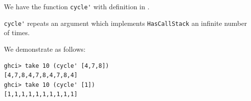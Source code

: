 We have the function \verb|cycle'| with definition in .

\verb|cycle'| repeats an argument which implements \verb|HasCallStack| an
infinite number of times.\par
\qquad We demonstrate as follows:
\begin{lstlisting}
ghci> take 10 (cycle' [4,7,8])
[4,7,8,4,7,8,4,7,8,4]
ghci> take 10 (cycle' [1])
[1,1,1,1,1,1,1,1,1,1]
\end{lstlisting}
